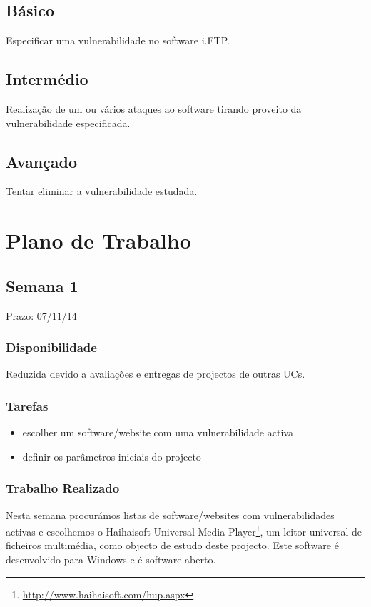 \documentclass[a4paper]{article}
\begin{document}
\subsection*{Básico}
Especificar uma vulnerabilidade no software i.FTP.
\subsection*{Intermédio}
Realização de um ou vários ataques ao software tirando proveito da vulnerabilidade especificada.
\subsection*{Avançado}
Tentar eliminar a vulnerabilidade estudada.


\pagebreak
\section{Plano de Trabalho}

\subsection{Semana 1}
Prazo: 07/11/14
\subsubsection{Disponibilidade}
Reduzida devido a avaliações e entregas de projectos de outras UCs.

\subsubsection{Tarefas}
\begin{itemize}
\item escolher um software/website com uma vulnerabilidade activa
\item definir os parâmetros iniciais do projecto
\end{itemize}

\subsubsection{Trabalho Realizado}
Nesta semana procurámos listas de software/websites com vulnerabilidades activas e escolhemos o Haihaisoft Universal Media Player\footnote{\url{http://www.haihaisoft.com/hup.aspx}}, um leitor universal de ficheiros multimédia, como objecto de estudo deste projecto. Este software é desenvolvido para Windows e é software aberto.
\end{document}

